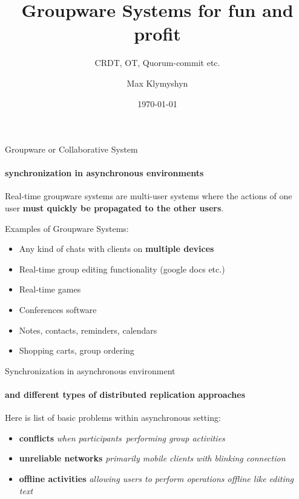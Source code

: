 \documentclass{beamer}
\title{Groupware Systems for fun and profit}
\subtitle{CRDT, OT, Quorum-commit etc.} %
\author{Max Klymyshyn}
\date{\today}
\begin{document}
\begin{frame}
\titlepage
\end{frame}



\begin{frame}{Groupware or Collaborative System}
\framesubtitle{synchronization in asynchronous environments}


\begin{block}{}
Real-time groupware systems are multi-user systems
where the actions of one user 
\textbf{must quickly be propagated to the other users}.
\end{block}

\vspace{0.5cm}
Examples of Groupware Systems:


\begin{itemize}
\item Any kind of chats with clients on \textbf{multiple devices}
\item Real-time group editing functionality (google docs etc.)
\item Real-time games
\item Conferences software
\item Notes, contacts, reminders, calendars
\item Shopping carts, group ordering
\end{itemize}

\end{frame}


\begin{frame}{Synchronization in asynchronous environment}
\framesubtitle{and different types of distributed replication approaches}

Here is list of basic problems within asynchronous setting:
\begin{itemize}
\item \textbf{conflicts} \small{\textit{when participants performing group activities}}
\item \textbf{unreliable networks} \small{\textit{primarily mobile clients with blinking connection}}
\item \textbf{offline activities} \small{\textit{allowing users to perform operations offline like editing text}}
\end{itemize}
\end{frame}
\end{document}
